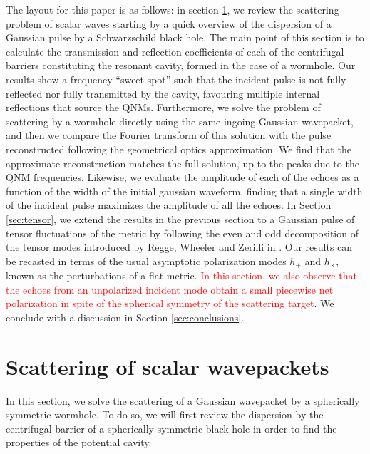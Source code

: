 \documentclass[article,aps,nofootinbib,twocolumn,superscriptaddress]{revtex4-1}
\begin{document}
The layout for this paper is as follows: in section \ref{sec:scalar}, we review the scattering problem of scalar waves starting by a quick overview of the dispersion of a Gaussian pulse by a Schwarzschild black hole. The main point of this section is to calculate the transmission and reflection coefficients of each of the centrifugal barriers constituting the resonant cavity, formed in the case of a wormhole. Our results show a frequency ``sweet spot'' such that the incident pulse is not fully reflected nor fully transmitted by the cavity, favouring multiple internal reflections that source the QNMs.  Furthermore, we solve the problem of scattering by a wormhole directly using the same ingoing Gaussian wavepacket, and then we compare the Fourier transform of this solution with the pulse reconstructed following the geometrical optics approximation. We find that the approximate reconstruction matches the full solution, up to the peaks due to the QNM frequencies. Likewise, we evaluate the amplitude of each of the echoes as a function of the width of the initial gaussian waveform, finding that a single width of the incident pulse maximizes the amplitude of all the echoes. In Section \ref{sec:tensor}, we extend the results in the previous section to a Gaussian pulse of tensor fluctuations of the metric by following the even and odd decomposition of the tensor modes introduced by Regge, Wheeler and Zerilli in \citep{Regge:1957td, PhysRevD.2.2141, PhysRevD.5.2419, PhysRevD.5.2439}. Our results can be recasted in terms of the usual asymptotic polarization modes $h_+$ and $h_{\times}$, known as the perturbations of a flat metric. \textcolor{red}{In this section, we also observe that the echoes from an unpolarized incident mode obtain a small piecewise net polarization in spite of the spherical symmetry of the scattering target}. We conclude with a discussion in Section \ref{sec:conclusions}.

\section{Scattering of scalar wavepackets}\label{sec:scalar}
In this section, we solve the scattering of a Gaussian wavepacket by a spherically symmetric wormhole. To do so, we will first review the dispersion by the centrifugal barrier of a spherically symmetric black hole in order to find the properties of the potential cavity.
\end{document}
